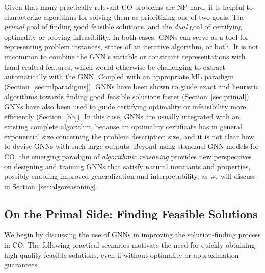 \documentclass[twoside,11pt]{article}
\newcommand{\new}[1]{\emph{#1}}
\newcommand{\cm}[1]{{{\textcolor{orange}{\textbf{[CM:} {#1}\textbf{]}}}}}
\begin{document}
Given that many practically relevant CO problems are \textsf{NP}-hard, it is helpful to characterize algorithms for solving them as prioritizing one of two goals. The \textit{primal} goal of finding good feasible solutions, and the \textit{dual} goal of certifying optimality or proving infeasibility. In both cases, GNNs can serve as a tool for representing problem instances, states of an iterative algorithm, or both. It is not uncommon to combine the GNN's variable or constraint representations with hand-crafted features, which would otherwise be challenging to extract automatically with the GNN. Coupled with an appropriate ML paradigm (Section~\ref{sec:mlparadigms}), GNNs have been shown to guide exact and heuristic algorithms towards finding good feasible solutions faster (Section~\ref{sec:primal}). GNNs have also been used to guide certifying optimality or infeasibility more efficiently (Section~\ref{bb}). In this case, GNNs are usually integrated with an existing complete algorithm, because an optimality certificate has in general exponential size concerning the problem description size, and it is not clear how to devise GNNs with such large outputs. Beyond using standard GNN models for CO, the emerging paradigm of \new{algorithmic reasoning} provides new perspectives on designing and training GNNs that satisfy natural invariants and properties, possibly enabling improved generalization and interpretability, as we will discuss in Section~\ref{sec:algoreasoning}.

\subsection{On the Primal Side: Finding Feasible Solutions}\label{primal}
\label{sec:primal}


We begin by discussing the use of GNNs in improving the solution-finding process in CO. 
The following practical scenarios motivate the need for quickly obtaining high-quality feasible solutions, even if without optimality or approximation guarantees.
\end{document}
